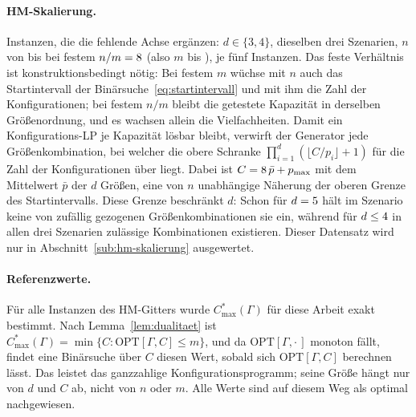 \begin{table}[htbp]
\centering

\caption{Aufbau des HM-Gitters. Je Szenario \HmInstanzenSzenario{} Instanzen aus
  $d \in \{\HmDMin,\dots,\HmDMax\}$, drei Maschinenzahlen, drei Verhältnissen $n/m$ und zehn
  Instanzen je Kombination.}
\label{tab:hm-datensatz}
\end{table}

\paragraph{HM-Skalierung.}
\HmSkalInstanzen{} Instanzen, die die fehlende Achse ergänzen: $d \in \{3,4\}$, dieselben drei
Szenarien, $n$ von \HmSkalNMin{} bis \HmSkalNMax{} bei festem $n/m = 8$ (also $m$ bis
\HmSkalMMax), je fünf Instanzen.
Das feste Verhältnis ist konstruktionsbedingt nötig: Bei festem $m$ wüchse mit $n$ auch das
Startintervall der Binärsuche~\eqref{eq:startintervall} und mit ihm die Zahl der
Konfigurationen; bei festem $n/m$ bleibt die getestete Kapazität in derselben Größenordnung, und
es wachsen allein die Vielfachheiten.
Damit ein Konfigurations-LP je Kapazität lösbar bleibt, verwirft der Generator jede
Größenkombination, bei welcher die obere Schranke $\prod_{i=1}^{d} (\lfloor C/p_i \rfloor + 1)$ für die
Zahl der Konfigurationen über \HmSkalBudget{} liegt.
Dabei ist $C = 8\,\bar{p} + p_{\max}$ mit dem Mittelwert $\bar{p}$ der $d$ Größen,
eine von $n$ unabhängige Näherung der oberen Grenze des Startintervalls.
Diese Grenze beschränkt $d$: Schon für $d = 5$ hält im Szenario
\HmSkalSzenarioLuecke{} keine von \HmSkalZuege{} zufällig gezogenen Größenkombinationen sie ein,
während für $d \le 4$ in allen drei Szenarien zulässige Kombinationen existieren.
Dieser Datensatz wird nur in Abschnitt~\ref{sub:hm-skalierung} ausgewertet.

\paragraph{Referenzwerte.}
Für alle \HmInstanzen{} Instanzen des HM-Gitters wurde $C^{*}_{\max}(\Gamma)$ für diese Arbeit
exakt bestimmt.
Nach Lemma~\ref{lem:dualitaet} ist
$C^{*}_{\max}(\Gamma) = \min\{C : \mathrm{OPT}[\Gamma, C] \le m\}$, und da
$\mathrm{OPT}[\Gamma,\cdot\,]$ monoton fällt, findet eine Binärsuche über $C$ diesen Wert,
sobald sich $\mathrm{OPT}[\Gamma, C]$ berechnen lässt.
Das leistet das ganzzahlige Konfigurationsprogramm; seine Größe hängt nur von $d$ und $C$ ab,
nicht von $n$ oder $m$.
Alle \HmInstanzen{} Werte sind auf diesem Weg als optimal nachgewiesen.

